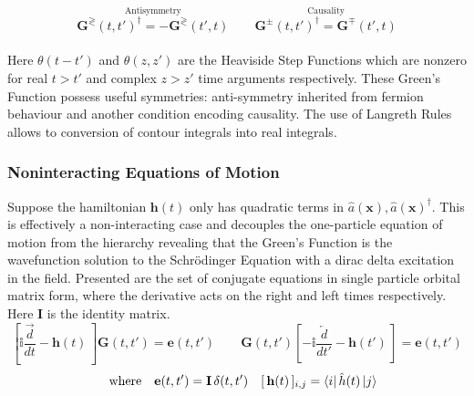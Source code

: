\documentclass{article}[12pt]
\numberwithin{equation}{section}
\begin{document}
\begin{equation}\label{eq:green-symmetry}
\overset{\text{Antisymmetry}}
{\mathbf{G}^{\gtrless}(t,t')^{\dagger}=-\mathbf{G}^{\gtrless}(t',t)}
\qquad
\overset{\text{Causality}}
{\mathbf{G}^{\pm}(t,t')^{\dagger}=\mathbf{G}^{\mp}(t',t)}
\end{equation}\vspace{-10pt}\\
Here $\theta(t-t')$ and $\theta(z,z')$ are
the Heaviside Step Functions which are nonzero for real $t>t'$ and complex
$z>z'$ time arguments respectively. These Green's Function possess useful symmetries: anti-symmetry inherited from fermion behaviour and another condition encoding causality. The use of Langreth Rules \cite{stefanucci2013} allows to conversion of contour integrals into real integrals.
\subsubsection{Noninteracting Equations of Motion}\vspace{-10pt}
Suppose the hamiltonian $\mathbf{h}(t)$ only has quadratic terms in
$\hat{a}(\mathbf{x}),\hat{a}(\mathbf{x})^\dagger$. This is effectively a
non-interacting case and decouples the one-particle equation
of motion from the hierarchy revealing that the Green's Function is the
wavefunction solution to the Schr\"odinger Equation with a dirac delta
excitation in the field. Presented are the  set of conjugate equations in
single particle orbital matrix form, where the derivative acts on the right and left
times respectively. Here $\mathbf I$ is the identity matrix.\vspace{-10pt}
\begin{equation}\label{eq:non-interacting}
\left[\mathbb{i}\frac{\overrightarrow{d}}{dt}-\mathbf{h}(t)\,\right]
\mathbf{G}(t,t')=\mathbf{e}(t,t')
\qquad
\mathbf{G}(t,t')
\left[-\mathbb{i}\frac{\overleftarrow{d}}{dt'}-\mathbf{h}(t')\,\right]
=\mathbf{e}(t,t')
\end{equation}\vspace{-15pt}
\begin{equation*}
\quad\text{where}\quad
\mathbf{e}(t,t')=\mathbf{I}\,\delta(t,t')
\quad
[\,\mathbf h(t)\,]_{i,j}=\bra{i}\hat h(t)\ket{j}
\end{equation*}
\end{document}
